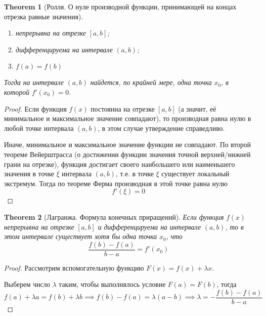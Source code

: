 \documentclass[a4paper]{article}
\theoremstyle{named}
\newtheorem*{namedtheorem}{Theorem}
\begin{document}
\begin{colloq}
\begin{namedtheorem}[Ролля. О нуле производной функции, принимающей на концах отрезка равные значения]
			\begin{enumerate}
				\item
				непрерывна на отрезке $[a, b]$;

				\item
				дифференцируема на интервале $(a, b)$;

				\item
				$f(a) = f(b)$
			\end{enumerate}

			Тогда на интервале $(a, b)$ найдется, по крайней мере, одна точка $x_0$, в которой $f'(x_0) = 0$.
		\end{namedtheorem}

		\begin{proof}
			Если функция $f(x)$ постоянна на отрезке $[a, b]$ (а значит, её минимальное и максимальное значение совпадают), то производная равна нулю в любой точке интервала $(a, b)$, в этом случае утверждение справедливо.

			Иначе, минимальное и максимальное значение функции не совпадают. По второй теореме Вейерштрасса (о достижении функции значения точной верхней/нижней грани на отрезке), функция достигает своего наибольшего или наименьшего значения в точке $\xi$ интервала $(a, b)$, т.е. в точке $\xi$ существует локальный экстремум. Тогда по теореме Ферма производная в этой точке равна нулю
			\begin{equation*}
				f'(\xi) = 0
			\end{equation*}
		\end{proof}

		\begin{namedtheorem}[Лагранжа. Формула конечных приращений]
			Если функция $f(x)$ непрерывна на отрезке $[a, b]$ и дифференцируема на интервале $(a, b)$, то в этом интервале существует хотя бы одна точка $x_0$, что
			\begin{equation*}
				\dfrac{f(b) - f(a)}{b - a} = f'(x_0)
			\end{equation*}
		\end{namedtheorem}

		\begin{proof}
			Рассмотрим вспомогательную функцию $F(x) = f(x) + \lambda x$.

			Выберем число $\lambda$ таким, чтобы выполнялось условие $F(a) = F(b)$, тогда
			\begin{equation*}
				f(a) + \lambda a = f(b) + \lambda b 
				\implies f(b) - f(a) = \lambda(a - b) 
				\implies \lambda = -\dfrac{f(b) - f(a)}{b - a}
			\end{equation*}


\end{proof}
\end{colloq}
\end{document}

